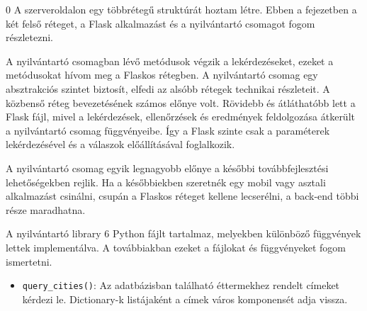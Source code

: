 0
A szerveroldalon egy többrétegű struktúrát hoztam létre. Ebben a fejezetben a két felső réteget, a Flask alkalmazást és a nyilvántartó csomagot fogom részletezni.


A nyilvántartó csomagban lévő metódusok végzik a lekérdezéseket, ezeket a metódusokat hívom meg a Flaskos rétegben. A nyilvántartó csomag egy absztrakciós szintet biztosít, elfedi az alsóbb rétegek technikai részleteit. A közbenső réteg bevezetésének számos előnye volt. Rövidebb és átláthatóbb lett a Flask fájl, mivel a lekérdezések, ellenőrzések és eredmények feldolgozása átkerült a nyilvántartó csomag függvényeibe. Így a Flask szinte csak a paraméterek lekérdezésével és a válaszok előállításával foglalkozik.

A nyilvántartó csomag egyik legnagyobb előnye a későbbi továbbfejlesztési lehetőségekben rejlik. Ha a későbbiekben szeretnék egy mobil vagy asztali alkalmazást csinálni, csupán a Flaskos réteget kellene lecserélni, a back-end többi része maradhatna.

A nyilvántartó library 6 Python fájlt tartalmaz, melyekben különböző függvények lettek implementálva. A továbbiakban ezeket a fájlokat és függvényeket fogom ismertetni.


\begin{itemize}
    \item \texttt{query\_cities()}: Az adatbázisban található éttermekhez rendelt címeket kérdezi le. Dictionary-k listájaként a címek város komponensét adja vissza.
\end{itemize}


